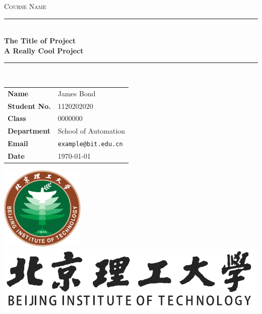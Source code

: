 \documentclass[11pt,english, openany]{book}
\begin{document}

\begin{titlepage}
	\clearpage\thispagestyle{empty}
	\centering
	\vspace{1cm}

	{\normalsize 
		\textsc{Course Name}
	}
		\vspace{2.5cm}
		
	\rule{\linewidth}{2mm} \\[0.5cm]
	{ \Huge\bfseries The Title of Project\\[0.2em]
		A Really Cool Project}\\[0.5cm]
	\rule{\linewidth}{0.6mm} \\[3.4cm]

	\hspace{2cm}
		\large \begin{tabular}{l p{5cm}}
		\textbf{Name} & James Bond \\[10pt]
		\textbf{Student No.} & 1120202020 \\[10pt]
		\textbf{Class} & 0000000 \\[10pt]
		\textbf{Department} & School of Automation \\[10pt]
		\textbf{Email} & \texttt{example@bit.edu.cn} \\[10pt]
		\textbf{Date} & \today \\            
		\end{tabular}
   
    
    \vfill
    \centering \includegraphics[height=4cm]{bit_logo.pdf}\\ %
    \centering \includegraphics[scale=0.4]{logo_slogan.pdf}
    \vspace{0.5cm}

		
	
	
	\pagebreak

\end{titlepage}
\end{document}
